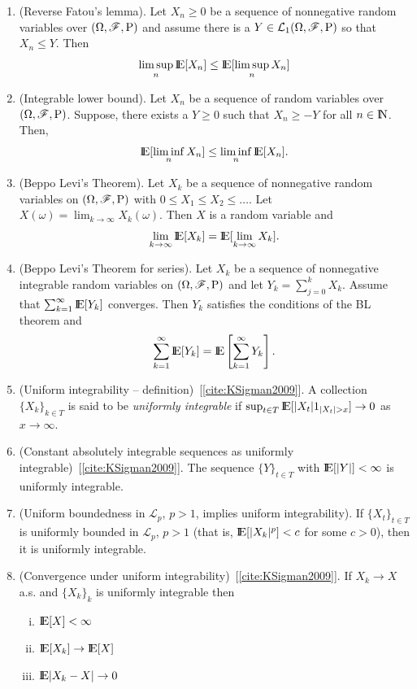 \documentclass[a4paper,10pt]{article}
\begin{document}
\begin{enumerate}
 \item 	(Reverse Fatou's lemma). Let $X_n\geq 0$ be a sequence of nonnegative random variables over $(\Omega,\mathscr{F},\mathrm{P})$ and
	assume there is a $Y\in\mathcal{L}_1(\Omega,\mathscr{F},\mathrm{P})$ so that $X_n\leq Y$. Then
	\[ 
	 \limsup_n \E[X_n] \leq \E[\limsup_n X_n]
	\]
 \item (Integrable lower bound). 	
	Let $X_n$ be a sequence of random variables over $(\Omega,\mathscr{F},\mathrm{P})$. Suppose, there exists a
	$Y\geq 0$ such that $X_n\geq -Y$ for all $n\in\N$. Then,
	\[
	\E[\liminf_n X_n] \leq  \liminf_n \E[X_n].
	\]
 \item (Beppo Levi's Theorem).
	Let $X_k$ be a sequence of nonnegative random variables on $(\Omega,\mathscr{F},\mathrm{P})$ with $0 \leq X_1 \leq X_{2} \leq \ldots$. 
	Let $X(\omega) = \lim_{k\to\infty}X_k(\omega)$. Then $X$ is a random variable and 
	\[
	 \lim_{k\to\infty} \E[X_k] = \E[\lim_{k\to\infty} X_k].
	\]
 \item (Beppo Levi's Theorem for series).
       Let $X_k$ be a sequence of nonnegative integrable random variables on $(\Omega,\mathscr{F},\mathrm{P})$
       and let $Y_k = \sum_{j=0}^k X_k$. Assume that $\sum_{k=1}^{\infty} \E[Y_k]$ converges.
       Then $Y_k$ satisfies the conditions of the BL theorem and
       \[
        \sum_{k=1}^{\infty} \E[Y_k] = \E \left[\sum_{k=1}^{\infty}Y_k\right].
       \]

 \item (Uniform integrability -- definition)~[\ref{cite:KSigman2009}]. A collection $\{X_k\}_{k\in T}$ is said to be \textit{uniformly
        integrable} if $\sup_{t\in T}\E[|X_t| 1_{|X_t|>x}] \to 0$ as $x\to\infty$.
        
 \item (Constant absolutely integrable sequences as uniformly integrable)~[\ref{cite:KSigman2009}]. The sequence $\{Y\}_{t\in T}$
       with $\E[|Y|]<\infty$ is uniformly integrable.

 \item (Uniform boundedness in $\mathcal{L}_p$, $p>1$, implies uniform integrability).
       If $\{X_t\}_{t\in T}$ is uniformly bounded in $\mathcal{L}_p$, $p>1$ (that is, 
       $\E[|X_k|^p] < c$ for some $c>0$), then it is uniformly integrable.
       
 \item (Convergence under uniform integrability)~[\ref{cite:KSigman2009}]. If $X_k \to X$ a.s. and $\{X_k\}_k$ is uniformly 
       integrable then
       \begin{enumerate}[i.]
         \item $\E[X]< \infty$
         \item $\E[X_k] \to \E[X]$        
        \item $\E|X_k-X|\to 0$
       \end{enumerate}

\end{enumerate}
\end{document}

